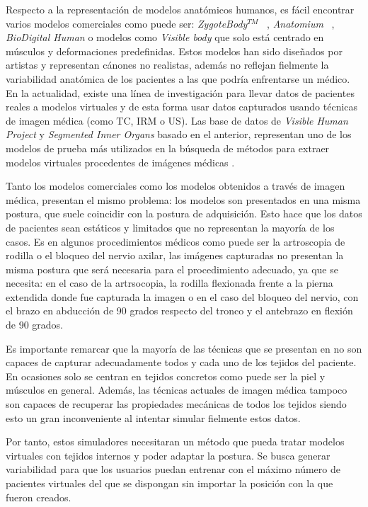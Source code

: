 Respecto a la representación de modelos anatómicos humanos, es fácil encontrar  varios modelos comerciales como puede ser: \emph{ZygoteBody}$^{TM}$ ~\cite{kelc2012zygote}, \emph{Anatomium} ~\cite{Anatomium},   \emph{BioDigital Human} \cite{qualter2012biodigital} o modelos como \emph{Visible body}\cite{visible2012visible} que solo está centrado en músculos y deformaciones predefinidas. Estos modelos han sido  diseñados por artistas y representan cánones no realistas, además no reflejan fielmente la variabilidad anatómica de los pacientes a las que podría enfrentarse un médico. En la actualidad, existe una línea de investigación para llevar datos de pacientes reales a modelos virtuales y de esta forma usar datos capturados usando técnicas de imagen médica (como \ac{TC}, \ac{IRM} o \ac{US}). Las base de datos de  \emph{Visible Human Project}\cite{ackerman1998visible} y  \emph{Segmented Inner Organs}\cite{VoxelMan} basado en el anterior, representan uno de los modelos de prueba más utilizados en la búsqueda de métodos para extraer modelos virtuales procedentes de imágenes médicas \cite{ferrante2017slice}.

Tanto los modelos comerciales como los modelos obtenidos a través de imagen médica, presentan el mismo problema: los modelos son presentados en una misma postura, que suele coincidir con la postura de adquisición. Esto hace que los datos de pacientes sean estáticos y limitados que no representan la mayoría de los casos. Es en algunos procedimientos médicos como puede ser la artroscopia de rodilla o el bloqueo del nervio axilar, las imágenes capturadas no presentan la misma postura que será necesaria para el procedimiento adecuado, ya que se necesita: en el caso de la artrsocopia, la rodilla flexionada frente a la pierna extendida donde fue capturada la imagen o en el caso del bloqueo del nervio, con el brazo en abducción de 90 grados respecto del tronco y el antebrazo en flexión de 90 grados. 

Es importante remarcar que la mayoría de las técnicas que se presentan en \cite{ferrante2017slice} no son capaces de capturar adecuadamente todos y cada uno de los tejidos del paciente. En ocasiones solo se centran en tejidos concretos como puede ser la piel y músculos en general. Además, las técnicas actuales de imagen médica tampoco son capaces de recuperar las propiedades mecánicas de todos los tejidos siendo esto un gran inconveniente al intentar simular fielmente estos datos.

Por tanto, estos simuladores necesitaran un método que pueda tratar modelos virtuales con tejidos internos y poder adaptar la postura. Se busca generar variabilidad para que los usuarios puedan entrenar con el máximo número de pacientes virtuales del que se dispongan sin importar la posición con la que fueron creados.

